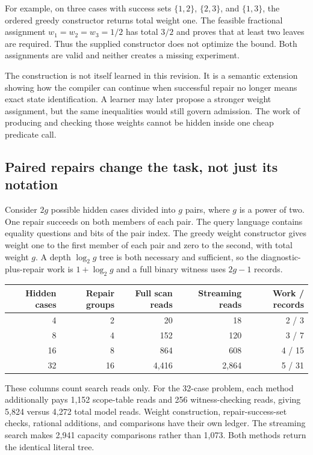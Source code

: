 \documentclass[11pt,letterpaper]{article}
\theoremstyle{plain}
\theoremstyle{definition}
\begin{document}
For example, on three cases with success sets $\{1,2\}$, $\{2,3\}$, and $\{1,3\}$, the ordered greedy constructor returns total weight one. The feasible fractional assignment $w_1=w_2=w_3=1/2$ has total $3/2$ and proves that at least two leaves are required. Thus the supplied constructor does not optimize the bound. Both assignments are valid and neither creates a missing experiment.

The construction is not itself learned in this revision. It is a semantic extension showing how the compiler can continue when successful repair no longer means exact state identification. A learner may later propose a stronger weight assignment, but the same inequalities would still govern admission. The work of producing and checking those weights cannot be hidden inside one cheap predicate call.

\subsection{Paired repairs change the task, not just its notation}
Consider $2g$ possible hidden cases divided into $g$ pairs, where $g$ is a power of two. One repair succeeds on both members of each pair. The query language contains equality questions and bits of the pair index. The greedy weight constructor gives weight one to the first member of each pair and zero to the second, with total weight $g$. A depth $\log_2g$ tree is both necessary and sufficient, so the diagnostic-plus-repair work is $1+\log_2g$ and a full binary witness uses $2g-1$ records.

\begin{center}\small
\begin{tabular}{@{}rrrrr@{}}\toprule
Hidden cases & Repair groups & Full scan reads & Streaming reads & Work / records\\\midrule
4 & 2 & 20 & 18 & 2 / 3\\
8 & 4 & 152 & 120 & 3 / 7\\
16 & 8 & 864 & 608 & 4 / 15\\
32 & 16 & 4,416 & 2,864 & 5 / 31\\\bottomrule
\end{tabular}
\end{center}

These columns count search reads only. For the 32-case problem, each method additionally pays 1,152 scope-table reads and 256 witness-checking reads, giving 5,824 versus 4,272 total model reads. Weight construction, repair-success-set checks, rational additions, and comparisons have their own ledger. The streaming search makes 2,941 capacity comparisons rather than 1,073. Both methods return the identical literal tree.
\end{document}
